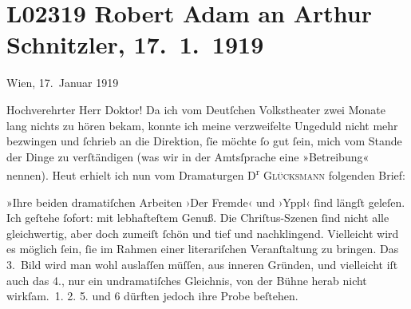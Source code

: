 

\section[Robert Adam an Arthur Schnitzler, 17. 1. 1919]{L02319 Robert Adam an Arthur Schnitzler, 17. 1. 1919}
\nopagebreak{}
\rehead{ }\normalsize\beginnumbering{}
\toendnotes[C]{\smallbreak\pagebreak[2]}
\toendnotes[C]{\smallbreak}
\pstart
           \raggedleft{}{\pb}Wien, 17. Januar 1919\pend
           
\pstart{}Hochverehrter Herr Doktor!\pend\vspace{0.5em}
\pstart
           Da ich vom Deutſchen Volkstheater zwei Monate lang
               nichts zu hören bekam, konnte ich meine verzweifelte Ungeduld nicht mehr bezwingen
               und ſchrieb an die Direktion, ſie möchte ſo gut ſein, mich vom Stande der Dinge zu
               verſtändigen (was wir in der Amtsſprache eine »Betreibung« nennen). Heut erhielt ich
               nun vom Dramaturgen D\textsuperscript{r}{ }\textsc{Glücksmann} folgenden Brief:\pend
           
\pstart
           »Ihre beiden dramatiſchen Arbeiten ›Der Fremde‹
               und ›Yppl‹ ſind längſt geleſen. Ich geſtehe
               ſofort: mit lebhafteſtem Genuß. Die Chriſtus-Szenen ſind nicht alle gleichwertig, aber doch zumeiſt ſchön und tief
               und nachklingend. Vielleicht wird es möglich ſein, ſie im Rahmen einer {\pb}literariſchen Veranſtaltung zu bringen.
               Das 3. Bild wird man wohl auslaſſen müſſen, aus inneren Gründen, und vielleicht iſt
               auch das 4., nur ein undramatiſches Gleichnis, von der Bühne herab nicht
                  wirkſam. 1.{ }2.{ }5. und 6 dürften jedoch ihre Probe beſtehen.\pend
           
